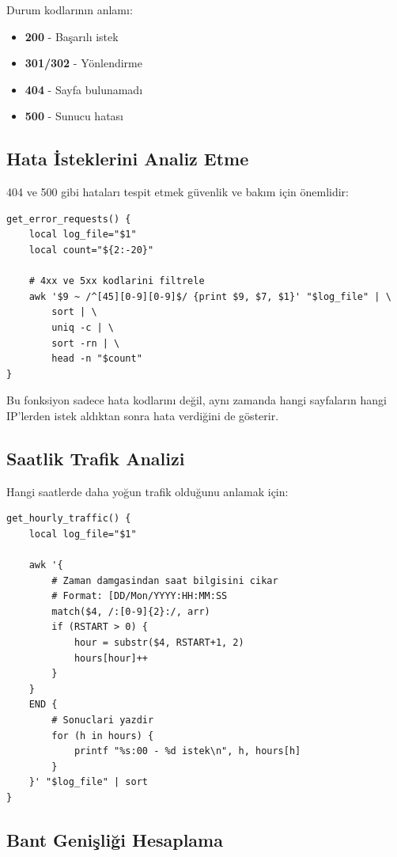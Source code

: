 \documentclass[12pt,a4paper]{report}
\begin{document}
Durum kodlarının anlamı:
\begin{itemize}
    \item \textbf{200} - Başarılı istek
    \item \textbf{301/302} - Yönlendirme
    \item \textbf{404} - Sayfa bulunamadı
    \item \textbf{500} - Sunucu hatası
\end{itemize}

\subsection{Hata İsteklerini Analiz Etme}

404 ve 500 gibi hataları tespit etmek güvenlik ve bakım için önemlidir:

\begin{lstlisting}[style=bashstyle,caption={Hata Analizi Fonksiyonu}]
get_error_requests() {
    local log_file="$1"
    local count="${2:-20}"
    
    # 4xx ve 5xx kodlarini filtrele
    awk '$9 ~ /^[45][0-9][0-9]$/ {print $9, $7, $1}' "$log_file" | \
        sort | \
        uniq -c | \
        sort -rn | \
        head -n "$count"
}
\end{lstlisting}

Bu fonksiyon sadece hata kodlarını değil, aynı zamanda hangi sayfaların hangi IP'lerden istek aldıktan sonra hata verdiğini de gösterir.

\subsection{Saatlik Trafik Analizi}

Hangi saatlerde daha yoğun trafik olduğunu anlamak için:

\begin{lstlisting}[style=bashstyle,caption={Saatlik Trafik Fonksiyonu}]
get_hourly_traffic() {
    local log_file="$1"
    
    awk '{
        # Zaman damgasindan saat bilgisini cikar
        # Format: [DD/Mon/YYYY:HH:MM:SS
        match($4, /:[0-9]{2}:/, arr)
        if (RSTART > 0) {
            hour = substr($4, RSTART+1, 2)
            hours[hour]++
        }
    }
    END {
        # Sonuclari yazdir
        for (h in hours) {
            printf "%s:00 - %d istek\n", h, hours[h]
        }
    }' "$log_file" | sort
}
\end{lstlisting}

\subsection{Bant Genişliği Hesaplama}
\end{document}
